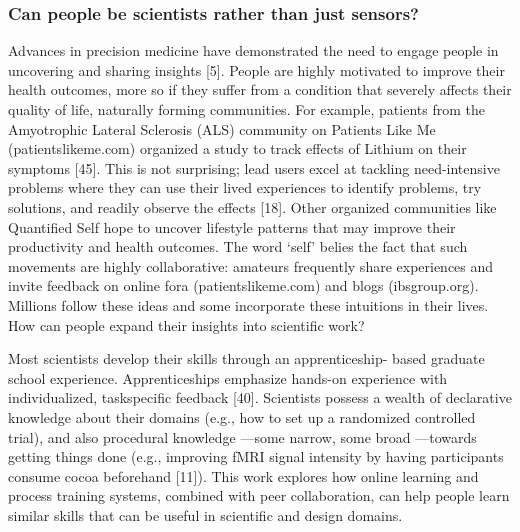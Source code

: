 \subsubsection{Can people be scientists rather than just sensors?}
Advances in precision medicine have demonstrated the need
to engage people in uncovering and sharing insights [5]. People
are highly motivated to improve their health outcomes,
more so if they suffer from a condition that severely affects
their quality of life, naturally forming communities. For example,
patients from the Amyotrophic Lateral Sclerosis
(ALS) community on Patients Like Me (patientslikeme.com)
organized a study to track effects of Lithium on their symptoms
[45]. This is not surprising; lead users excel at tackling
need-intensive problems where they can use their lived
experiences to identify problems, try solutions, and readily
observe the effects [18]. Other organized communities like
Quantified Self hope to uncover lifestyle patterns that may
improve their productivity and health outcomes. The word
‘self’ belies the fact that such movements are highly collaborative:
amateurs frequently share experiences and invite
feedback on online fora (patientslikeme.com) and blogs
(ibsgroup.org). Millions follow these ideas and some incorporate
these intuitions in their lives. How can people expand
their insights into scientific work?

Most scientists develop their skills through an apprenticeship-
based graduate school experience. Apprenticeships emphasize
hands-on experience with individualized, taskspecific
feedback [40]. Scientists possess a wealth of declarative
knowledge about their domains (e.g., how to set up a
randomized controlled trial), and also procedural knowledge
—some narrow, some broad —towards getting things done
(e.g., improving fMRI signal intensity by having participants
consume cocoa beforehand [11]). This work explores how
online learning and process training systems, combined with
peer collaboration, can help people learn similar skills that
can be useful in scientific and design domains.


